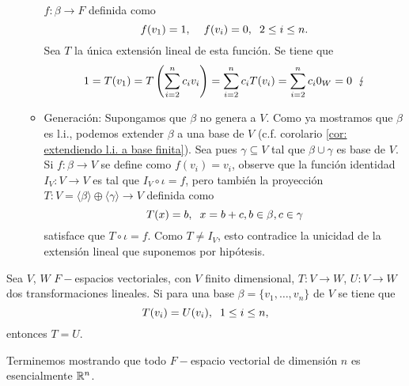 \begin{itemize}
\begin{itemize}
		$f: \beta \longrightarrow F$ definida como
		\[
		f(v_{1}) = 1, 
		\hspace{0.4cm} f(v_{i}) = 0,
		\hspace{0.2cm} 2 \leq i \leq n. 
		\]
		Sea $T$ la única extensión lineal de esta función.
		Se tiene que
		\[
		1 = T(v_{1}) = T \left( \sum_{i=2}^{n}c_{i}v_{i} \right)
		= \sum_{i=2}^{n} c_{i} T(v_{i}) = 
		\sum_{i=2}^{n} c_{i} 0_{W} = 0
		\hspace{0.2cm} \lightning 
		\]
		\item Generación: 
		Supongamos que $\beta$ no genera a $V$. Como 
		ya mostramos que $\beta$ es l.i., podemos extender $\beta$
		a una base de $V$ (c.f. corolario
		\ref{cor: extendiendo l.i. a base finita}).
		Sea pues $\gamma \subseteq V$ tal que 
		$\beta \cup \gamma$ es base de $V$. Si $f: \beta \longrightarrow V$
		se define como $f(v_{i}) = v_{i}$, observe que
		la función identidad $I_{V}: V \longrightarrow V$
		es tal que $I_{V} \circ \iota = f$, pero también la 
		proyección $T: V
		= \langle \beta \rangle
		\oplus \langle \gamma \rangle \longrightarrow V$ 
		definida como
		\[
		T(x) = b, \hspace{0.2cm} x = b + c, b \in \beta,
		c \in \gamma
		\]
		satisface que $T \circ \iota = f$. Como
		$T \neq I_{V}$, esto contradice la unicidad
		de la extensión lineal que suponemos por hipótesis.
	\end{itemize}
\end{itemize}

\QEDB
\vspace{0.2cm}

\begin{cor}
	\label{cor: del teor fund bases}
Sea $V$, $W$ $F-$espacios vectoriales, con $V$ finito dimensional,
$T: V \longrightarrow W$, $U: V \longrightarrow W$ dos
transformaciones lineales. Si para una base
$\beta = \{ v_{1}, \ldots, v_{n} \}$ de $V$ se tiene que
\[
T(v_{i}) = U(v_{i}), \hspace{0.2cm} 1 \leq i \leq n,
\]
entonces $T = U$.
\end{cor}

Terminemos mostrando que todo $F-$espacio vectorial de 
dimensión $n$ es esencialmente $\mathbb{R}^{n}$.

